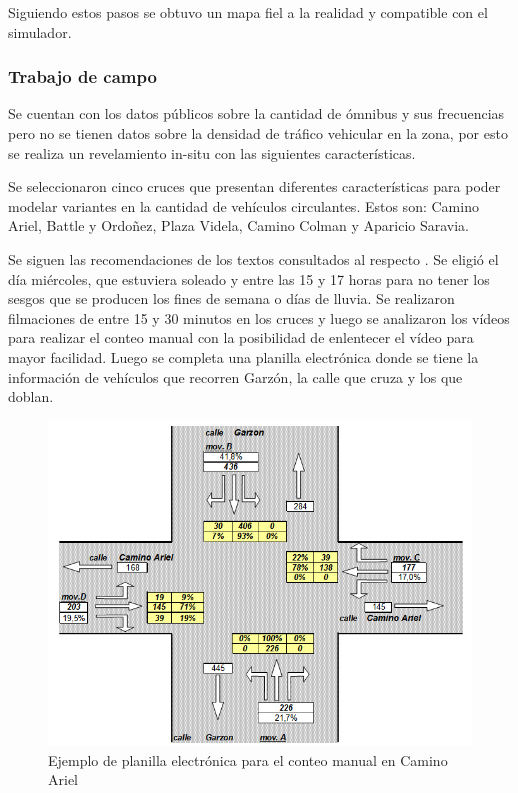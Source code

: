 Siguiendo estos pasos se obtuvo un mapa fiel a la realidad y compatible con el simulador.


\subsubsection{Trabajo de campo}
Se cuentan con los datos públicos sobre la cantidad de  ómnibus y sus frecuencias pero no se tienen datos sobre la densidad de tráfico vehicular en la zona, por esto se realiza un revelamiento in-situ con las siguientes características.

Se seleccionaron cinco cruces que presentan diferentes características para poder modelar variantes en la cantidad de vehículos circulantes.
Estos son: Camino Ariel, Battle y Ordoñez, Plaza Videla, Camino Colman y Aparicio Saravia. 

Se siguen las recomendaciones de los textos consultados al respecto \citep{ConteoTrafico}. Se eligió el día miércoles, que estuviera soleado y entre las 15 y 17 horas para no tener los sesgos que se producen los fines de semana o días de lluvia.
Se realizaron filmaciones de entre 15 y 30 minutos en los cruces y luego se analizaron los vídeos para realizar el conteo manual con la posibilidad de enlentecer el vídeo para mayor facilidad. Luego se completa una planilla electrónica donde se tiene la información de vehículos que recorren Garzón, la calle que cruza y los que doblan. 

\begin{figure}[H]
	\centering
	\includegraphics[width=0.9\linewidth]{Figures/conteo_hoja}
	\caption{Ejemplo de planilla electrónica para el conteo manual en Camino Ariel}
	\label{fig:conteo_hoja}
\end{figure}



